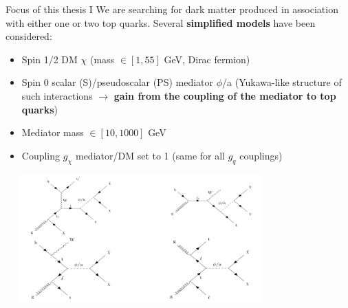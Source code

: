 \documentclass[8pt]{beamer}
\begin{document}
\begin{frame}{Focus of this thesis I}
\justifying
We are searching for \alert{dark matter produced in association with either one or two top quarks}. Several \textbf{simplified models} have been considered:

\begin{itemize} 
	\justifying
	\item Spin 1/2 DM $\chi$ (mass $\in [1, 55]$ GeV, Dirac fermion) \\
	\item Spin 0 scalar (S)/pseudoscalar (PS) mediator $\phi$/a (Yukawa-like structure of such interactions $\rightarrow$ \textbf{gain from the coupling of the mediator to top quarks}) \\
	\item Mediator mass $\in [10, 1000]$ GeV \\
	\item Coupling $g_{\chi}$ mediator/DM set to 1 (same for all $g_q$ couplings) \\
\end{itemize}\vfill

\begin{center}
\includegraphics[width=0.78\textwidth, height=140pt]{figs/AllFeynman.png}
\end{center}


\end{frame}
\end{document}
